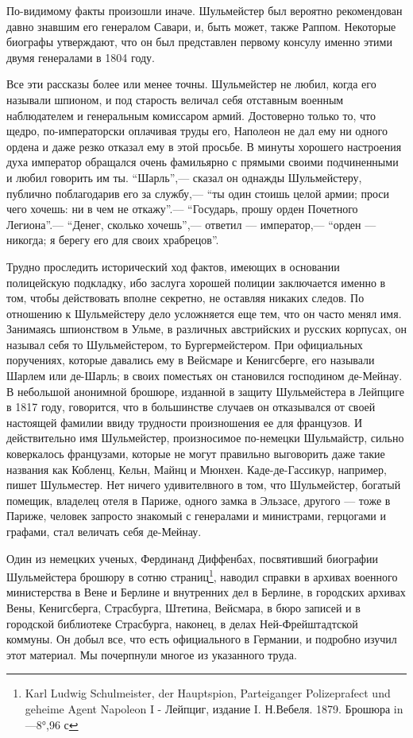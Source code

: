 \documentclass[
  oneside,
  12pt,
  titlepage]{book}
\begin{document}
По-видимому факты произошли иначе. Шульмейстер был вероятно рекомендован давно знавшим его генералом Савари, и, быть может, также Раппом. Некоторые биографы утверждают, что он был представлен первому консулу именно этими двумя генералами в 1804 году.

Все эти рассказы более или менее точны. Шульмейстер не любил, когда его называли шпионом, и под старость величал себя отставным военным наблюдателем и генеральным комиссаром армий. Достоверно только то, что щедро, по-императорски оплачивая труды его, Наполеон не дал ему ни одного ордена и даже резко отказал ему в этой просьбе. В минуты хорошего настроения духа император обращался очень фамильярно с прямыми своими подчиненными и любил говорить им ты. ``Шарль'',--- сказал он однажды Шульмейстеру, публично поблагодарив его за службу,--- ``ты один стоишь целой армии; проси чего хочешь: ни в чем не откажу''.--- ``Государь, прошу орден Почетного Легиона''.--- ``Денег, сколько хочешь'',--- ответил --- император,--- ``орден --- никогда; я берегу его для своих храбрецов''.

Трудно проследить исторический ход фактов, имеющих в основании полицейскую подкладку, ибо заслуга хорошей полиции заключается именно в том, чтобы действовать вполне секретно, не оставляя никаких следов. По отношению к Шульмейстеру дело усложняется еще тем, что он часто менял имя. Занимаясь шпионством в Ульме, в различных австрийских и русских корпусах, он называл себя то Шульмейстером, то Бургермейстером. При официальных поручениях, которые давались ему в Вейсмаре и Кенигсберге, его называли Шарлем или де-Шарль; в своих поместьях он становился господином де-Мейнау. В небольшой анонимной брошюре, изданной в защиту Шульмейстера в Лейпциге в 1817 году, говорится, что в большинстве случаев он отказывался от своей настоящей фамилии ввиду трудности произношения ее для французов. И действительно имя Шульмейстер, произносимое по-немецки Шульмайстр, сильно коверкалось французами, которые не могут правильно выговорить даже такие названия как Кобленц, Кельн, Майнц и Мюнхен. Каде-де-Гассикур, например, пишет Шульместер. Нет ничего удивителвного в том, что Шульмейстер, богатый помещик, владелец отеля в Париже, одного замка в Эльзасе, другого --- тоже в Париже, человек запросто знакомый с генералами и министрами, герцогами и графами, стал величать себя де-Мейнау.

Один из немецких ученых, Фердинанд Диффенбах, посвятивший биографии Шульмейстера брошюру в сотню страниц\footnote{Karl Ludwig Schulmeister, der Hauptspion, Parteiganger Polizeprafect und geheime Agent Napoleon I - Лейпциг, издание I. Н.Вебеля. 1879. Брошюра in---8°,96 с}, наводил справки в архивах военного министерства в Вене и Берлине и внутренних дел в Берлине, в городских архивах Вены, Кенигсберга, Страсбурга, Штетина, Вейсмара, в бюро записей и в городской библиотеке Страсбурга, наконец, в делах Ней-Фрейштадтской коммуны. Он добыл все, что есть официального в Германии, и подробно изучил этот материал. Мы почерпнули многое из указанного труда.
\end{document}

